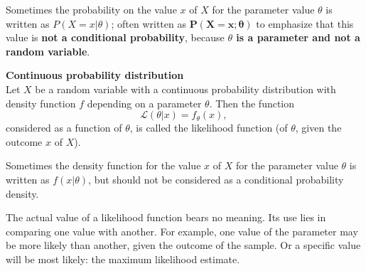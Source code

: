 \documentclass{article}
\begin{document}
Sometimes the probability on the value $x$ of $X$ for the parameter value $\theta$ is written as $P(X=x|\theta)$; often written as $\mathbf{P(X=x;\theta)}$ to emphasize that this value is \textbf{not a conditional probability}, because \textbf{$\theta$ is a parameter and not a random variable}.

\textbf{Continuous probability distribution}\\
Let $X$ be a random variable with a continuous probability distribution with density function $f$ depending on a parameter $\theta$. Then the function
$$ \mathcal{L}(\theta |x) = f_{\theta} (x), \, $$
considered as a function of $\theta$, is called the likelihood function (of $\theta$, given the outcome $x$ of $X$).

Sometimes the density function for the value $x$ of $X$ for the parameter value $\theta$ is written as $f(x|\theta)$,
but should not be considered as a conditional probability density.

The actual value of a likelihood function bears no meaning. Its use lies in comparing one value with another.
For example, one value of the parameter may be more likely than another, given the outcome of the sample.
Or a specific value will be most likely: the maximum likelihood estimate.
\end{document}
